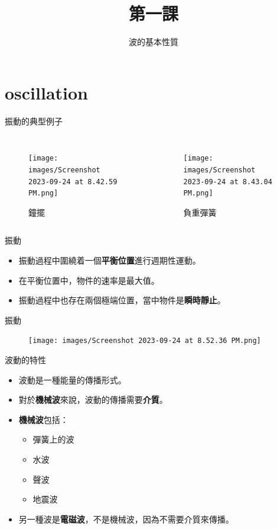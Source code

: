\documentclass[13pt]{beamer}
\title{第一課}
\author{波的基本性質}
\institute{}
\date{}
\begin{document}
\frame{\titlepage}



\section{oscillation}

\begin{frame}{振動的典型例子}
    \begin{columns}
        \begin{figure}
            \centering
            \texttt{[image: images/Screenshot 2023-09-24 at 8.42.59 PM.png]}
            \caption{鐘擺}

        \end{figure}
        \begin{figure}
            \centering
            \texttt{[image: images/Screenshot 2023-09-24 at 8.43.04 PM.png]}
            \caption{負重彈簧}

        \end{figure}
    \end{columns}
\end{frame}

\begin{frame}{振動}
    \begin{itemize}
        \item 振動過程中圍繞着一個\textbf{平衡位置}進行週期性運動。
        \item 在平衡位置中，物件的速率是最大值。
        \item 振動過程中也存在兩個極端位置，當中物件是\textbf{瞬時靜止}。
    \end{itemize}
\end{frame}

\begin{frame}{振動}
    \begin{figure}
        \centering
        \texttt{[image: images/Screenshot 2023-09-24 at 8.52.36 PM.png]}


    \end{figure}
\end{frame}


\begin{frame}{波動的特性}
    \begin{itemize}
        \item 波動是一種能量的傳播形式。
        \item 對於\textbf{機械波}來說，波動的傳播需要\textbf{介質}。
        \item \textbf{機械波}包括：
              \begin{itemize}
                  \item 彈簧上的波
                  \item 水波
                  \item 聲波
                  \item 地震波
              \end{itemize}
        \item 另一種波是\textbf{電磁波}，不是機械波，因為不需要介質來傳播。
    \end{itemize}
\end{frame}
\end{document}
